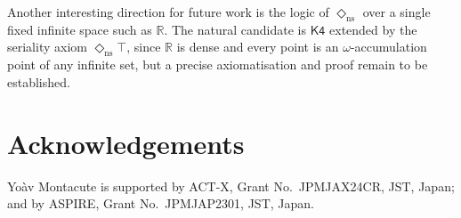 \documentclass[submission,copyright,creativecommons]{eptcs}
\newcommand{\diam}{\Diamond}
\newcommand{\lozengens}{\diam_\mathrm{ns}}
\begin{document}
Another interesting direction for future work is the logic of $\lozengens$ over a single fixed infinite space such as $\mathbb{R}$.
    The natural candidate is $\mathsf{K4}$ extended by the seriality axiom $\lozengens\top$, since $\mathbb{R}$ is dense and every point is an $\omega$-accumulation point of any infinite set, but a precise
    axiomatisation and proof remain to be established.

\section*{Acknowledgements}

Yo\`av Montacute is supported by ACT-X, Grant No.\ JPMJAX24CR, JST, Japan; and by ASPIRE, Grant No.\ JPMJAP2301, JST, Japan.






\end{document}
